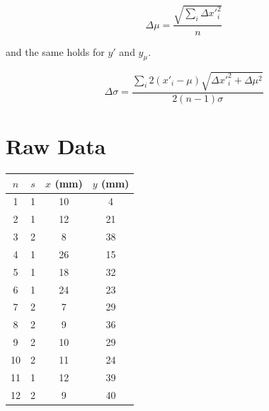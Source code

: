 \documentclass[12pt]{article}
\begin{document}
\begin{equation}
    \Delta \mu = \frac{\sqrt{\sum_i \Delta x'^2_i}}{n}
\end{equation}

and the same holds for $y'$ and $y_\mu$.

\begin{equation}
    \Delta \sigma = \frac{\sum_i 2(x'_i - \mu)\sqrt{\Delta x'^2_i + \Delta \mu^2}}{2(n-1)\sigma}
\end{equation}

\section{Raw Data}\label{rawdata}

\begin{table}[h!]
\begin{tabular}{| c | c | c | c |}
\hline
$n$ & $s$ & $x$ (mm)  & $y$ (mm) \\
\hline \hline
1 & 1 & 10 & 4 \\
\hline
2 & 1 & 12 & 21 \\
\hline
3 & 2 & 8 & 38 \\
\hline
4 & 1 & 26 & 15 \\
\hline
5 & 1 & 18 & 32 \\
\hline
6 & 1 & 24 & 23 \\
\hline
7 & 2 & 7 & 29 \\
\hline
8 & 2 & 9 & 36 \\
\hline
9 & 2 & 10 & 29 \\
\hline
10 & 2 & 11 & 24 \\
\hline
11 & 1 & 12 & 39 \\
\hline
12 & 2 & 9 & 40 \\
\hline
\end{tabular}
\end{table}
\end{document}
